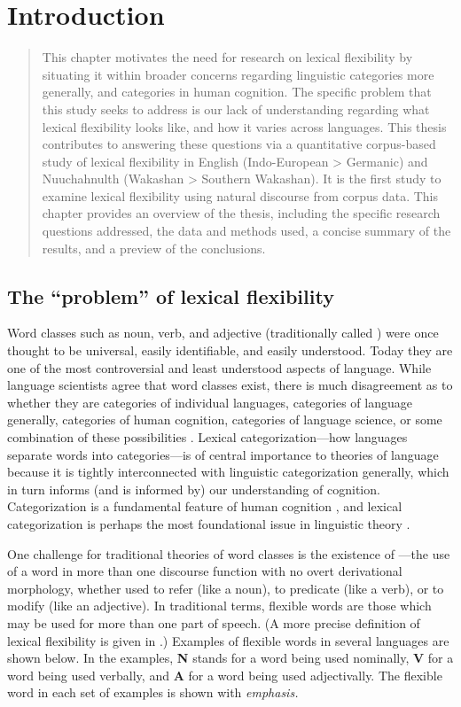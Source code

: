 \chapter{Introduction}
\label{ch:introduction}

\blockquote{This chapter motivates the need for research on lexical flexibility by situating it within broader concerns regarding linguistic categories more generally, and categories in human cognition. The specific problem that this study seeks to address is our lack of understanding regarding what lexical flexibility looks like, and how it varies across languages. This thesis contributes to answering these questions via a quantitative corpus-based study of lexical flexibility in English (Indo-European > Germanic) and Nuuchahnulth (Wakashan > Southern Wakashan). It is the first study to examine lexical flexibility using natural discourse from corpus data. This chapter provides an overview of the thesis, including the specific research questions addressed, the data and methods used, a concise summary of the results, and a preview of the conclusions.}

\section{The \enquote{problem} of lexical flexibility}
\label{sec:1.1}

Word classes such as noun, verb, and adjective (traditionally called ) were once thought to be universal, easily identifiable, and easily understood. Today they are one of the most controversial and least understood aspects of language. While language scientists agree that word classes exist, there is much disagreement as to whether they are categories of individual languages, categories of language generally, categories of human cognition, categories of language science, or some combination of these possibilities \parencites[166]{Mithun2017}{Haspelmath2018}{Hieberforthcoming}. Lexical categorization—how languages separate words into categories—is of central importance to theories of language because it is tightly interconnected with linguistic categorization generally, which in turn informs (and is informed by) our understanding of cognition. Categorization is a fundamental feature of human cognition \parencite[xi]{Taylor2003}, and lexical categorization is perhaps the most foundational issue in linguistic theory \parencites[36]{Croft1991}[1]{VapnarskyVeneziano2017}.

One challenge for traditional theories of word classes is the existence of —the use of a word in more than one discourse function with no overt derivational morphology, whether used to refer (like a noun), to predicate (like a verb), or to modify (like an adjective). In traditional terms, flexible words are those which may be used for more than one part of speech. (A more precise definition of lexical flexibility is given in .) Examples of flexible words in several languages are shown below. In the examples, \textbf{N} stands for a word being used nominally, \textbf{V} for a word being used verbally, and \textbf{A} for a word being used adjectivally. The flexible word in each set of examples is shown with \em{emphasis}.

